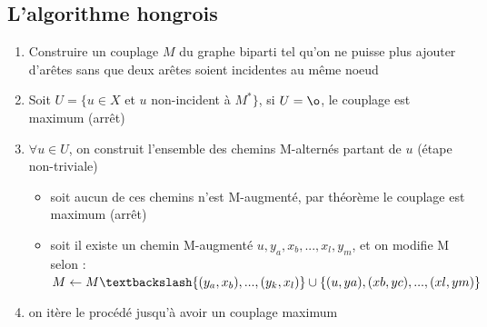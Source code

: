 \subsection{L'algorithme hongrois}
\begin{myalgo}
  \noindent
  \begin{enumerate}
    \item Construire un couplage $M$ du graphe biparti tel qu'on ne puisse plus ajouter d'arêtes sans que deux arêtes soient incidentes au même noeud
    \item Soit $U = \{u \in X$ et $u$ non-incident à $M^*\}$, si $U = \o$, le couplage est maximum (arrêt)
    \item $\forall u \in U$, on construit l'ensemble des chemins M-alternés partant de $u$ (étape non-triviale)
      \begin{itemize}
        \item soit aucun de ces chemins n'est M-augmenté, par théorème le couplage est maximum (arrêt)
        \item soit il existe un chemin M-augmenté $u,y_a,x_b,...,x_l,y_m$, et on modifie M selon :\\
        $M \leftarrow M \textbackslash\{(y_a,x_b),...,(y_k,x_l)\} \cup \{(u,ya),(xb,yc),...,(xl,ym)\}$
      \end{itemize}
    \item on itère le procédé jusqu'à avoir un couplage maximum
  \end{enumerate}
\end{myalgo}

